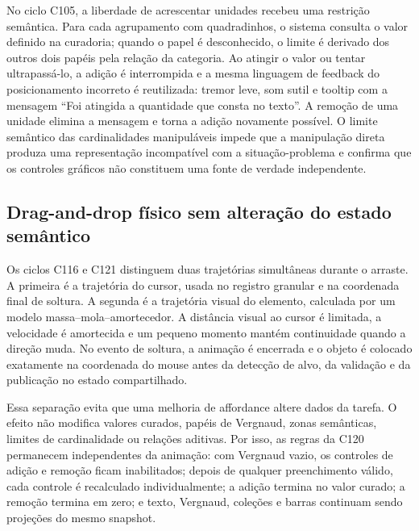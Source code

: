 \documentclass[preprint,12pt,authoryear]{elsarticle}
\begin{document}
No ciclo C105, a liberdade de acrescentar unidades recebeu uma restrição semântica. Para cada agrupamento com quadradinhos, o sistema consulta o valor definido na curadoria; quando o papel é desconhecido, o limite é derivado dos outros dois papéis pela relação da categoria. Ao atingir o valor ou tentar ultrapassá-lo, a adição é interrompida e a mesma linguagem de feedback do posicionamento incorreto é reutilizada: tremor leve, som sutil e tooltip com a mensagem ``Foi atingida a quantidade que consta no texto''. A remoção de uma unidade elimina a mensagem e torna a adição novamente possível. O limite semântico das cardinalidades manipuláveis impede que a manipulação direta produza uma representação incompatível com a situação-problema e confirma que os controles gráficos não constituem uma fonte de verdade independente.

\subsection{Drag-and-drop físico sem alteração do estado semântico}
Os ciclos C116 e C121 distinguem duas trajetórias simultâneas durante o arraste. A primeira é a trajetória do cursor, usada no registro granular e na coordenada final de soltura. A segunda é a trajetória visual do elemento, calculada por um modelo massa--mola--amortecedor. A distância visual ao cursor é limitada, a velocidade é amortecida e um pequeno momento mantém continuidade quando a direção muda. No evento de soltura, a animação é encerrada e o objeto é colocado exatamente na coordenada do mouse antes da detecção de alvo, da validação e da publicação no estado compartilhado.

Essa separação evita que uma melhoria de affordance altere dados da tarefa. O efeito não modifica valores curados, papéis de Vergnaud, zonas semânticas, limites de cardinalidade ou relações aditivas. Por isso, as regras da C120 permanecem independentes da animação: com Vergnaud vazio, os controles de adição e remoção ficam inabilitados; depois de qualquer preenchimento válido, cada controle é recalculado individualmente; a adição termina no valor curado; a remoção termina em zero; e texto, Vergnaud, coleções e barras continuam sendo projeções do mesmo snapshot.
\end{document}
